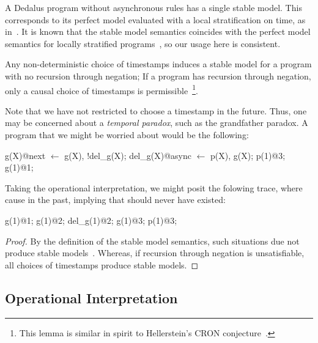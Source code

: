 A Dedalus program without asynchronous rules has a single stable model.  This corresponds to its perfect model evaluated with a local stratification on time, as in~\cite{deductiveupdates}.  It is known that the stable model semantics coincides with the perfect model semantics for locally stratified programs~\cite{stable-model}, so our usage here is consistent.


\begin{lemma}
Any non-deterministic choice of timestamps induces a stable model for a \lang program with no recursion through negation; If a \lang program has recursion through negation, only a causal choice of timestamps is permissible~\footnote{This lemma is similar in spirit to Hellerstein's CRON conjecture~\cite{declarative-imperative}.}.
\end{lemma}

Note that we have not restricted  to choose a timestamp in the future.  Thus, one may be concerned about a {\em temporal paradox}, such as the grandfather paradox.  A program that we might be worried about would be the following:

\begin{Dedalus}
g(X)@next \(\leftarrow\) g(X), !del_g(X);
del_g(X)@async \(\leftarrow\) p(X), g(X);
p(1)@3;
g(1)@1;
\end{Dedalus}

Taking the operational interpretation, we might posit the folowing trace, where  cause  in the past, implying that  should never have existed:

\begin{Dedalus}
g(1)@1;
g(1)@2;
del_g(1)@2;
g(1)@3;
p(1)@3;
\end{Dedalus}

\begin{proof}
By the definition of the stable model semantics, such situations due not produce stable models~\cite{stable-model}.  Whereas, if recursion through negation is unsatisfiable, all choices of timestamps produce stable models.
\end{proof}

\subsection{Operational Interpretation}

